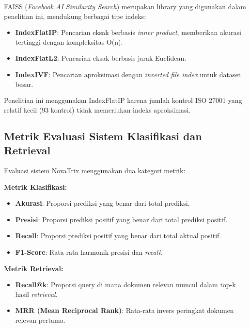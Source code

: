 \documentclass[bachelor,bahasa]{thesisdtetiugm}
\begin{document}
FAISS (\textit{Facebook AI Similarity Search}) merupakan library yang digunakan dalam penelitian ini, mendukung berbagai tipe indeks:
\begin{itemize}
	\item \textbf{IndexFlatIP}: Pencarian eksak berbasis \textit{inner product}, memberikan akurasi tertinggi dengan kompleksitas O(n).
	\item \textbf{IndexFlatL2}: Pencarian eksak berbasis jarak Euclidean.
	\item \textbf{IndexIVF}: Pencarian aproksimasi dengan \textit{inverted file index} untuk dataset besar.
\end{itemize}

Penelitian ini menggunakan IndexFlatIP karena jumlah kontrol ISO 27001 yang relatif kecil (93 kontrol) tidak memerlukan indeks aproksimasi.

\subsection{Metrik Evaluasi Sistem Klasifikasi dan Retrieval}

Evaluasi sistem NovaTrix menggunakan dua kategori metrik:

\textbf{Metrik Klasifikasi:}
\begin{itemize}
	\item \textbf{Akurasi}: Proporsi prediksi yang benar dari total prediksi.
	\item \textbf{Presisi}: Proporsi prediksi positif yang benar dari total prediksi positif.
	\item \textbf{Recall}: Proporsi prediksi positif yang benar dari total aktual positif.
	\item \textbf{F1-Score}: Rata-rata harmonik presisi dan \textit{recall}.
\end{itemize}

\textbf{Metrik Retrieval:}
\begin{itemize}
	\item \textbf{Recall@k}: Proporsi query di mana dokumen relevan muncul dalam top-k hasil \textit{retrieval}.
	\item \textbf{MRR (Mean Reciprocal Rank)}: Rata-rata invers peringkat dokumen relevan pertama.
\end{itemize}

\cleardoublepage {}
\thereferences


\end{document}
